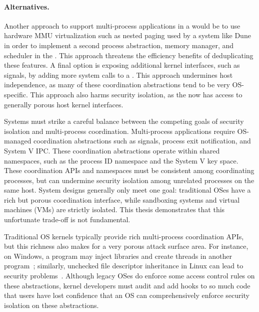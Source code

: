 \paragraph{Alternatives.}
Another approach to support multi-process applications in a \libos{} 
would be to use hardware MMU virtualization such as nested paging
used by a system like Dune~\citep{belay12dune}
in order to implement a second process abstraction, memory manager, and scheduler in the \libos{}.
This approach threatens the efficiency benefits of deduplicating these features.
A final option is exposing additional kernel interfaces, such as signals, 
by adding more system calls to a \picoproc{}.
This approach undermines host independence, as many of these coordination abstractions 
tend to be very OS-specific.
This approach also harms security isolation, as the \libos{} now has access to generally 
porous host kernel interfaces.  


Systems must strike a careful balance between the competing goals of
security isolation and
multi-process coordination.
Multi-process applications require OS-managed coordination abstractions
such as signals, process exit notification, and System V IPC.
These coordination abstractions operate within shared namespaces, such as the 
process ID namespace
and the System V key space.
These coordination APIs and namespaces must be consistent among coordinating processes,
but can %
undermine security isolation among unrelated processes on the same host.
System designs generally only meet one goal: 
traditional OSes have a rich but porous coordination interface, 
while sandboxing systems and virtual machines (VMs) 
are strictly isolated.
This thesis demonstrates that this unfortunate trade-off is not
fundamental.


Traditional OS kernels typically provide  rich multi-process coordination 
APIs, but this richness also makes for a very porous attack surface
area.  For instance, on Windows, a program may inject libraries and
create threads in another program~\citep{windows-dll-inject}; 
similarly, unchecked file descriptor inheritance in Linux can lead to
security problems~\citep{close-on-exec}.  
Although legacy OSes do enforce some access control rules on these abstractions,
kernel developers must audit and add hooks to so much code
that
users have lost confidence that an OS can comprehensively enforce 
security isolation on these abstractions.

